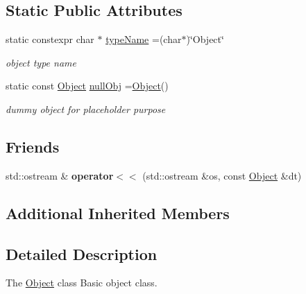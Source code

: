 \subsection*{Static Public Attributes}
\begin{DoxyCompactItemize}
\item 
\hypertarget{classObject_add9e5b23ab163db74d191ed7fe5b7f70}{}static constexpr char $\ast$ \hyperlink{classObject_add9e5b23ab163db74d191ed7fe5b7f70}{type\+Name} =(char$\ast$)\char`\"{}Object\char`\"{}\label{classObject_add9e5b23ab163db74d191ed7fe5b7f70}

\begin{DoxyCompactList}\small\item\em object type name \end{DoxyCompactList}\item 
\hypertarget{classObject_ad72b7e373242e30424c4affc2bf74497}{}static const \hyperlink{classObject}{Object} \hyperlink{classObject_ad72b7e373242e30424c4affc2bf74497}{null\+Obj} =\hyperlink{classObject}{Object}()\label{classObject_ad72b7e373242e30424c4affc2bf74497}

\begin{DoxyCompactList}\small\item\em dummy object for placeholder purpose \end{DoxyCompactList}\end{DoxyCompactItemize}
\subsection*{Friends}
\begin{DoxyCompactItemize}
\item 
\hypertarget{classObject_ad81b66e1f4a2583e5d275499463ef9da}{}std\+::ostream \& {\bfseries operator$<$$<$} (std\+::ostream \&os, const \hyperlink{classObject}{Object} \&dt)\label{classObject_ad81b66e1f4a2583e5d275499463ef9da}

\end{DoxyCompactItemize}
\subsection*{Additional Inherited Members}


\subsection{Detailed Description}
The \hyperlink{classObject}{Object} class Basic object class. 

